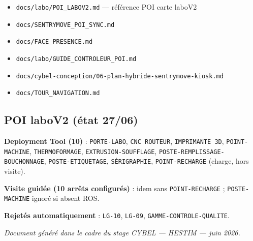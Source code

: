 \documentclass[11pt,a4paper]{article}
\begin{document}
\begin{itemize}[noitemsep]
  \item \texttt{docs/labo/POI\_LABOV2.md} — référence POI carte laboV2
  \item \texttt{docs/SENTRYMOVE\_POI\_SYNC.md}
  \item \texttt{docs/FACE\_PRESENCE.md}
  \item \texttt{docs/labo/GUIDE\_CONTROLEUR\_POI.md}
  \item \texttt{docs/cybel-conception/06-plan-hybride-sentrymove-kiosk.md}
  \item \texttt{docs/TOUR\_NAVIGATION.md}
\end{itemize}

\subsection{POI laboV2 (état 27/06)}

\textbf{Deployment Tool (10)} : \texttt{PORTE-LABO}, \texttt{CNC ROUTEUR}, \texttt{IMPRIMANTE 3D}, \texttt{POINT-MACHINE}, \texttt{THERMOFORMAGE}, \texttt{EXTRUSION-SOUFFLAGE}, \texttt{POSTE-REMPLISSAGE-BOUCHONNAGE}, \texttt{POSTE-ETIQUETAGE}, \texttt{SÉRIGRAPHIE}, \texttt{POINT-RECHARGE} (charge, hors visite).

\textbf{Visite guidée (10 arrêts configurés)} : idem sans \texttt{POINT-RECHARGE} ; \texttt{POSTE-MACHINE} ignoré si absent ROS.

\textbf{Rejetés automatiquement} : \texttt{LG-10}, \texttt{LG-09}, \texttt{GAMME-CONTROLE-QUALITE}.

\vfill
\begin{center}
\small\textit{Document généré dans le cadre du stage CYBEL — HESTIM — juin 2026.}
\end{center}
\end{document}
